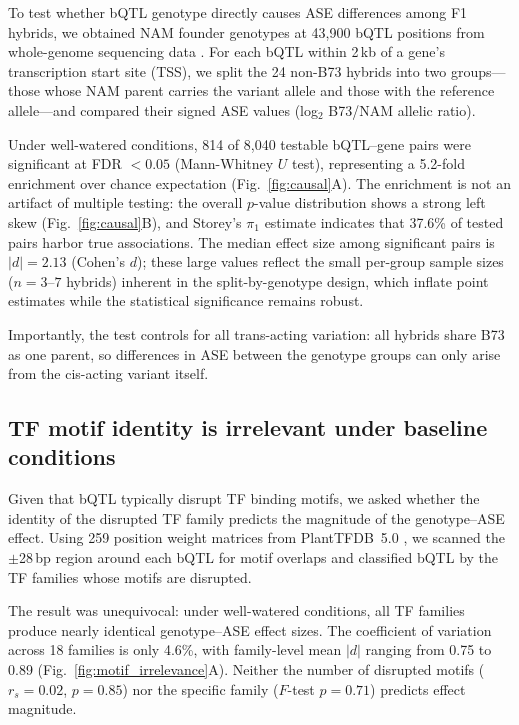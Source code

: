 \documentclass[10pt,letterpaper]{article}
\begin{document}
To test whether bQTL genotype directly causes ASE differences among F1
hybrids, we obtained NAM founder genotypes at 43,900 bQTL positions from
whole-genome sequencing data \cite{grzybowski2023}. For each bQTL within
2\,kb of a gene's transcription start site (TSS), we split the 24 non-B73
hybrids into two groups---those whose NAM parent carries the variant allele
and those with the reference allele---and compared their signed ASE values
(log$_2$ B73/NAM allelic ratio).

Under well-watered conditions, 814 of 8,040 testable bQTL--gene pairs were
significant at FDR $< 0.05$ (Mann-Whitney $U$ test), representing a 5.2-fold
enrichment over chance expectation (Fig.~\ref{fig:causal}A). The
enrichment is not an artifact of multiple testing: the overall $p$-value
distribution shows a strong left skew (Fig.~\ref{fig:causal}B), and Storey's
$\pi_1$ estimate indicates that 37.6\% of tested pairs harbor true
associations. The median effect size among significant pairs is
$|d| = 2.13$ (Cohen's $d$); these large values reflect the small per-group
sample sizes ($n = 3$--$7$ hybrids) inherent in the split-by-genotype design,
which inflate point estimates while the statistical significance remains
robust.

Importantly, the test controls for all trans-acting variation: all hybrids
share B73 as one parent, so differences in ASE between the genotype groups can
only arise from the cis-acting variant itself.

\subsection*{TF motif identity is irrelevant under baseline conditions}

Given that bQTL typically disrupt TF binding motifs, we asked whether the
identity of the disrupted TF family predicts the magnitude of the genotype--ASE
effect. Using 259 position weight matrices from PlantTFDB~5.0 \cite{tian2020},
we scanned the $\pm$28\,bp region around each bQTL for motif overlaps and
classified bQTL by the TF families whose motifs are disrupted.

The result was unequivocal: under well-watered conditions, all TF families
produce nearly identical genotype--ASE effect sizes. The coefficient of
variation across 18 families is only 4.6\%, with family-level mean
$|d|$ ranging from 0.75 to 0.89 (Fig.~\ref{fig:motif_irrelevance}A).
Neither the number of disrupted motifs ($r_s = 0.02$, $p = 0.85$) nor the
specific family ($F$-test $p = 0.71$) predicts effect magnitude.
\end{document}
